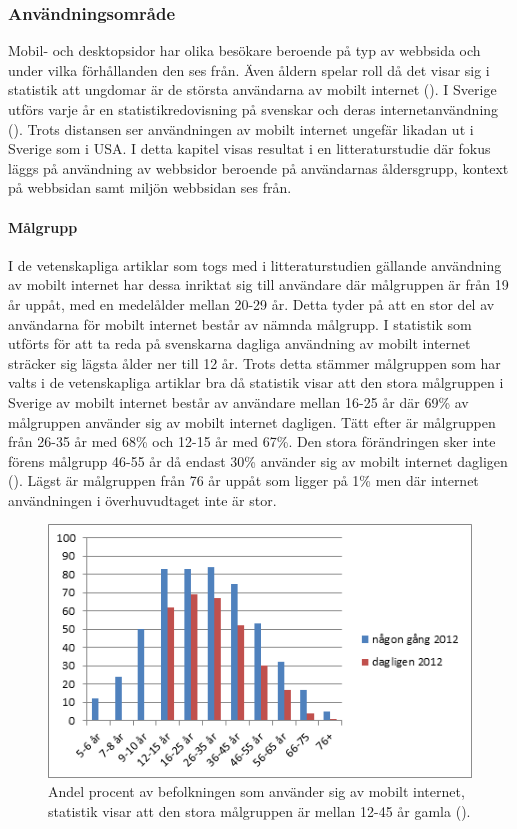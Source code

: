 \documentclass[11pt]{article}
\begin{document}
\subsubsection{Användningsområde}

Mobil- och desktopsidor har olika besökare beroende på typ av webbsida och under vilka förhållanden den ses från. Även åldern spelar roll då det visar sig i statistik att ungdomar är de största användarna av mobilt internet (\cite[s.24]{.se}). I Sverige utförs varje år en statistikredovisning på svenskar och deras internetanvändning (\cite{.se}). Trots distansen ser användningen av mobilt internet ungefär likadan ut i Sverige som i USA. I detta kapitel visas resultat i en litteraturstudie där fokus läggs på användning av webbsidor beroende på användarnas åldersgrupp, kontext på webbsidan samt miljön webbsidan ses från.

\paragraph{Målgrupp}\mbox{}

I de vetenskapliga artiklar som togs med i litteraturstudien gällande användning av mobilt internet har dessa inriktat sig till användare där målgruppen är från 19 år uppåt, med en medelålder mellan 20-29 år. Detta tyder på att en stor del av användarna för mobilt internet består av nämnda målgrupp. I statistik som utförts för att ta reda på svenskarna dagliga användning av mobilt internet sträcker sig lägsta ålder ner till 12 år. Trots detta stämmer målgruppen som har valts i de vetenskapliga artiklar bra då statistik visar att den stora målgruppen i Sverige av mobilt internet består av användare mellan 16-25 år där 69\% av målgruppen använder sig av mobilt internet dagligen. Tätt efter är målgruppen från 26-35 år med 68\% och 12-15 år med 67\%. Den stora förändringen sker inte förens målgrupp 46-55 år då endast 30\% använder sig av mobilt internet dagligen (\cite[s. 24]{.se}). Lägst är målgruppen från 76 år uppåt som ligger på 1\% men där internet användningen i överhuvudtaget inte är stor.
\\
\setcounter{figure}{4}
\begin{figure}[H]
  \centering
    \includegraphics[scale=0.8]{pics/statistikalder.png}
    \caption{Andel procent av befolkningen som använder sig av mobilt internet, statistik visar att den stora målgruppen är mellan 12-45 år gamla (\cite[s. 24]{.se}).}
\end{figure}
\end{document}
